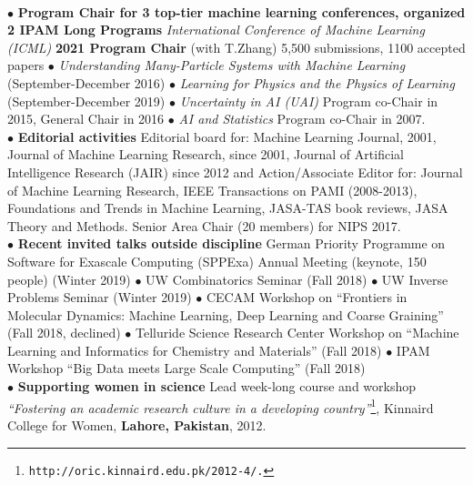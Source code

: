 \documentclass[11pt]{article}
\newcommand{\comment}[1]{}
\newcommand{\mysubtitle}[1]{\vspace{.1in}\hspace{-2em}{\bf #1\hspace{1.5em}}}
\begin{document}
\mysubtitle{Synergistic activities}

\comment{$\bullet$ {\bf Eight invited tutorials/lectures} on clustering and manifold learng: Machine Learning Summer School (2006, 2011), IMA Program on Topological Data Analysis (2013), European Spatial Agency (2005, 2009), Lorentz Workshop on ``Clusters, Games and Axioms''  (2015), IPAM Programs on Understanding Many Particle Systems (2016) and Learning for Physics and the Physics of Learning (2019). \comment{ Program and course development at UW: New Statistics PhD track in {\em Machine Learning and Big Data} introduced with Emily Fox (2013). Designed and introduced new course sequence (STAT 535, 538, 539) in Statistical Learning (2009/2010),  Special topic joint Stat/EE course at UW 2010, co-taught with Maryam Fazel {\em ``Sparse representations''}. Undergraduate UW ACMS (Applied Computational and Mathematical Statistics) Program Director.} \comment{{\bf Tutorial paper} with Chen, Y.-C., Koelle, S., McQueen, J., Chmiela, S, Tkatchenko, A. {\it ``Modern Manifold Learning Methods for Molecular Dynamics: A Tutorial Overview''} (submitted, 2019)}}
\\
$\bullet$ {\bf Program Chair for 3 top-tier machine learning conferences, organized 2 IPAM Long Programs} {\em International Conference of Machine Learning (ICML)} {\bf 2021 Program Chair} (with T.Zhang) 5,500 submissions, 1100 accepted papers  $\bullet$  {\em Understanding Many-Particle Systems with Machine Learning} (September-December 2016) $\bullet$ {\em Learning for Physics and the Physics of Learning}  (September-December 2019) $\bullet$   {\em Uncertainty in AI (UAI)} Program co-Chair in 2015, General Chair in 2016 $\bullet$ {\em AI and Statistics} Program co-Chair in 2007.
\\
$\bullet$ {\bf Editorial activities} Editorial board for: Machine Learning Journal, 2001, Journal of Machine Learning Research, since 2001, Journal of Artificial Intelligence Research (JAIR) since 2012 and Action/Associate Editor for: Journal of Machine Learning Research, IEEE Transactions on PAMI (2008-2013), Foundations and Trends in Machine Learning, JASA-TAS book reviews, JASA Theory and Methods. Senior Area Chair (20 members) for NIPS 2017. 
\\
$\bullet$ {\bf Recent invited talks outside discipline} German Priority Programme on Software for Exascale Computing (SPPExa) Annual Meeting (keynote, 150 people) (Winter 2019)\comment{{\tt http://www.sppexa.de/sppexa-activities/annual-plenary-meeting.html}} $\bullet$ UW Combinatorics Seminar (Fall 2018) $\bullet$ UW Inverse Problems Seminar (Winter 2019) $\bullet$ CECAM Workshop on ``Frontiers in Molecular Dynamics: Machine Learning, Deep Learning and Coarse Graining'' (Fall 2018, declined) $\bullet$ Telluride Science Research Center Workshop   on ``Machine Learning and Informatics for Chemistry and Materials'' (Fall 2018) $\bullet$ IPAM Workshop ``Big Data meets Large Scale Computing'' (Fall 2018)
\\
$\bullet$ {\bf  Supporting women in science} Lead week-long course and workshop {\it ``Fostering an academic research culture in a developing country''}\footnote{{\tt  http://oric.kinnaird.edu.pk/2012-4/.}},  Kinnaird College for Women, {\bf Lahore, Pakistan}, 2012.
\\
\end{document}
